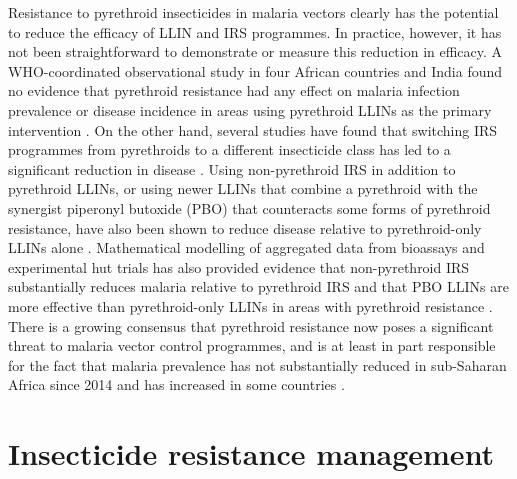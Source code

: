 \documentclass[a4paper,11pt,abstracton,hidelinks]{scrartcl}
\begin{document}
Resistance to pyrethroid insecticides in malaria vectors clearly has the potential to reduce the efficacy of LLIN and IRS programmes.
%
In practice, however, it has not been straightforward to demonstrate or measure this reduction in efficacy.
%
A WHO-coordinated observational study in four African countries and India found no evidence that pyrethroid resistance had any effect on malaria infection prevalence or disease incidence in areas using pyrethroid LLINs as the primary intervention \citep{Kleinschmidt2018}.
%
On the other hand, several studies have found that switching IRS programmes from pyrethroids to a different insecticide class has led to a significant reduction in disease \citep{Hargreaves2000,Kafy2017}. 
%
Using non-pyrethroid IRS in addition to pyrethroid LLINs, or using newer LLINs that combine a pyrethroid with the synergist piperonyl butoxide (PBO) that counteracts some forms of pyrethroid resistance, have also been shown to reduce disease relative to pyrethroid-only LLINs alone \citep{Protopopoff2018}. 
%
Mathematical modelling of aggregated data from bioassays and experimental hut trials has also provided evidence that non-pyrethroid IRS substantially reduces malaria relative to pyrethroid IRS \citep{SherrardSmith2018} and that PBO LLINs are more effective than pyrethroid-only LLINs in areas with pyrethroid resistance \citep{Churcher2016}.
%
There is a growing consensus that pyrethroid resistance now poses a significant threat to malaria vector control programmes, and is at least in part responsible for the fact that malaria prevalence has not substantially reduced in sub-Saharan Africa since 2014 and has increased in some countries \citep{Hemingway2016,WHO2019WMR}. 


\section{Insecticide resistance management}
\end{document}
